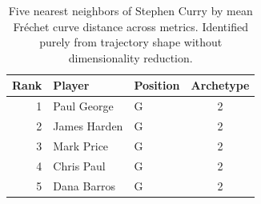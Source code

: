 \begin{table}[htbp]
  \centering\small
  \begin{tabular}{rllc}
    \toprule
    Rank & Player & Position & Archetype \\
    \midrule
    1 & Paul George & G & 2 \\
    2 & James Harden & G & 2 \\
    3 & Mark Price & G & 2 \\
    4 & Chris Paul & G & 2 \\
    5 & Dana Barros & G & 2 \\
    \bottomrule
  \end{tabular}
  \caption{Five nearest neighbors of Stephen Curry by mean Fr\'{e}chet curve distance across metrics. Identified purely from trajectory shape without dimensionality reduction.}
  \label{tab:Stephen_Curry_frechet_curve_neighbors}
\end{table}

